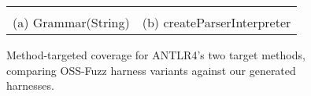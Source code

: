 \begin{figure}[t]
    \centering
    \begin{tabular}{cc}
         &
         \\
        (a) Grammar(String) & (b) createParserInterpreter
    \end{tabular}
    \caption{Method-targeted coverage for ANTLR4's two target methods, comparing OSS-Fuzz harness variants against our generated harnesses.}
    \label{fig:antlr4-coverage}
\end{figure}
